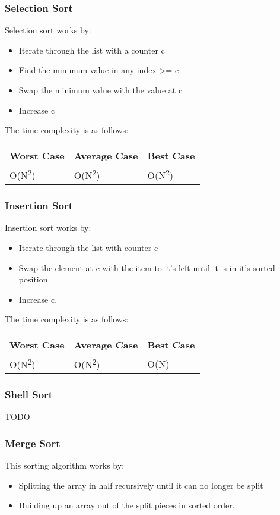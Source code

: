 \documentclass[11pt]{article}
\begin{document}
\subsubsection*{Selection Sort}
\label{sec:org1e5d698}
Selection sort works by:
\begin{itemize}
\item Iterate through the list with a counter c
\item Find the minimum value in any index >= c
\item Swap the minimum value with the value at c
\item Increase c
\end{itemize}

The time complexity is as follows:
\begin{center}
\begin{tabular}{lll}
Worst Case & Average Case & Best Case\\
\hline
O(N\textsuperscript{2}) & O(N\textsuperscript{2}) & O(N\textsuperscript{2})\\
\end{tabular}
\end{center}

\subsubsection*{Insertion Sort}
\label{sec:org630150e}
Insertion sort works by:
\begin{itemize}
\item Iterate through the list with counter c
\item Swap the element at c with the item to it's left until it is in it's sorted position
\item Increase c.
\end{itemize}

The time complexity is as follows:
\begin{center}
\begin{tabular}{lll}
Worst Case & Average Case & Best Case\\
\hline
O(N\textsuperscript{2}) & O(N\textsuperscript{2}) & O(N)\\
\end{tabular}
\end{center}

\subsubsection*{Shell Sort}
\label{sec:org491df6f}
TODO
\subsubsection*{Merge Sort}
\label{sec:orgfc61507}
This sorting algorithm works by:
\begin{itemize}
\item Splitting the array in half recursively until it can no longer be split
\item Building up an array out of the split pieces in sorted order.
\end{itemize}
\end{document}
